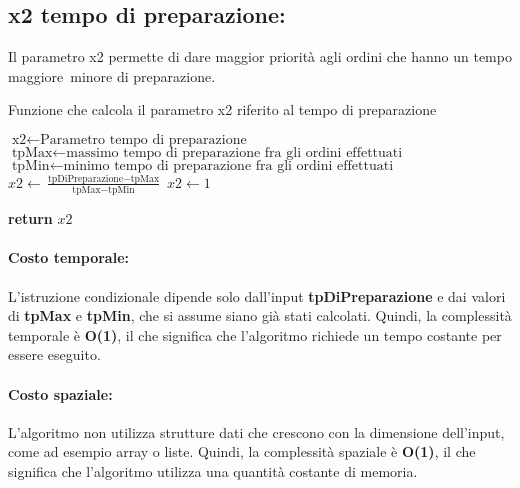 \subsection{x2 tempo di preparazione:}
Il  parametro x2 permette di dare maggior priorità agli ordini che hanno un tempo maggiore\ minore di preparazione.
\begin{algorithm}[h]
	\begin{algorithmic}[h!]
		\caption{Funzione che calcola il parametro x2 riferito al tempo di preparazione }
		\medskip
		\State $\text{x2} \gets \text{Parametro tempo di preparazione}$
		\State $\text{tpMax} \gets \text{massimo tempo di preparazione fra gli ordini effettuati}$
		\State $\text{tpMin} \gets \text{minimo tempo di preparazione fra gli ordini effettuati}$
		\medskip
		\State $x2 \gets \frac{\text{tpDiPreparazione} - \text{tpMax}}{\text{tpMax} - \text{tpMin}}$ 
		\Else
		\State $x2 \gets 1$
		\EndIf
		
		\State \textbf{return} $x2$ 
		\EndFunction
	\end{algorithmic}
\end{algorithm}

\paragraph{Costo temporale:}
L'istruzione condizionale dipende solo dall'input \textbf{tpDiPreparazione} e dai valori di \textbf{tpMax} e \textbf{tpMin}, che si assume siano già stati calcolati. Quindi, la complessità temporale è \textbf{O(1)}, il che significa che l'algoritmo richiede un tempo costante per essere eseguito.

\paragraph{Costo spaziale:}
L'algoritmo non utilizza strutture dati che crescono con la dimensione dell'input, come ad esempio array o liste. Quindi, la complessità spaziale è \textbf{O(1)}, il che significa che l'algoritmo utilizza una quantità costante di memoria.

